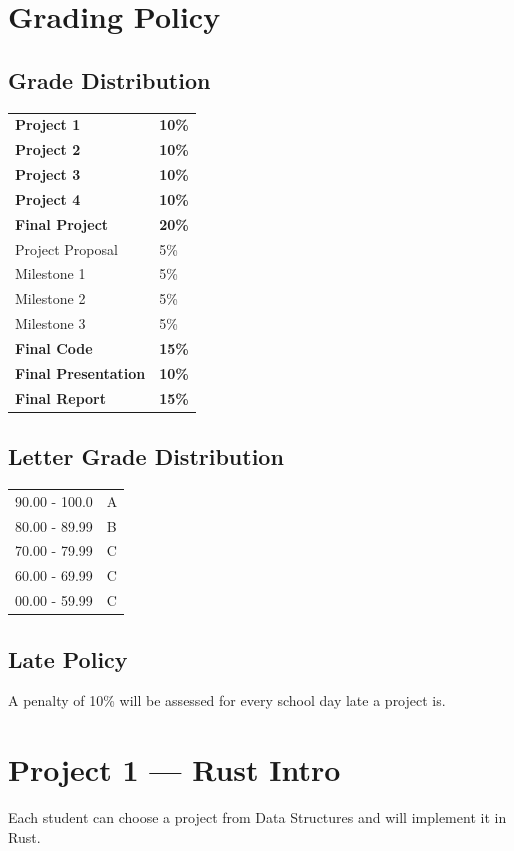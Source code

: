 \documentclass[11pt]{article}
\newcommand\tab[1][.5in]{\hspace*{#1}}
\begin{document}
\newpage
\section{Grading Policy}
\subsection{Grade Distribution}
\begin{tabular}{ll}
    \textbf{Project 1} & \textbf{10\%} \\
    \textbf{Project 2} & \textbf{10\%} \\
    \textbf{Project 3} & \textbf{10\%} \\
    \textbf{Project 4} & \textbf{10\%} \\
    \textbf{Final Project} & \textbf{20\%} \\
    \tab Project Proposal & 5\% \\
    \tab Milestone 1 & 5\% \\
    \tab Milestone 2 & 5\% \\
    \tab Milestone 3 & 5\% \\
    \textbf{Final Code} & \textbf{15\%} \\
    \textbf{Final Presentation} & \textbf{10\%} \\
    \textbf{Final Report} & \textbf{15\%} \\
\end{tabular}

\subsection{Letter Grade Distribution}
\begin{tabular}{ll}
    90.00 - 100.0 & A \\
    80.00 - 89.99 & B \\
    70.00 - 79.99 & C \\
    60.00 - 69.99 & C \\
    00.00 - 59.99 & C
\end{tabular}

\subsection{Late Policy}
A penalty of 10\% will be assessed for every school day late a project is.

\section{Project 1 --- Rust Intro}
Each student can choose a project from Data Structures and will implement it in
Rust.
\end{document}
